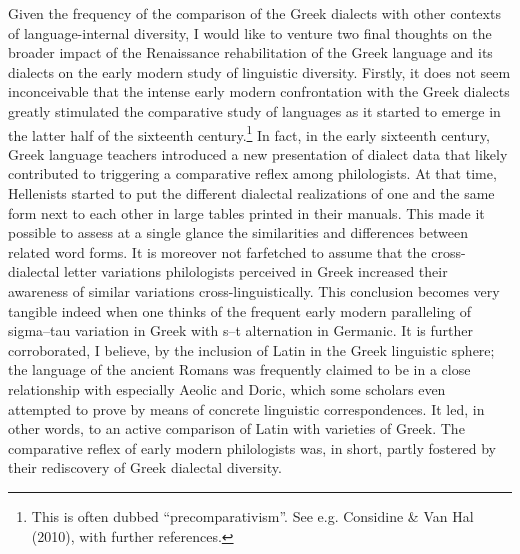 \begin{styleStandard}
Given the frequency of the comparison of the Greek dialects with other contexts of language-internal diversity, I would like to venture two final thoughts on the broader impact of the Renaissance rehabilitation of the Greek language and its dialects on the early modern study of linguistic diversity. Firstly, it does not seem inconceivable that the intense early modern confrontation with the Greek dialects greatly stimulated the comparative study of languages as it started to emerge in the latter half of the sixteenth century.\footnote{ This is often dubbed “precomparativism”. See e.g. Considine \& Van Hal (2010), with further references.} In fact, in the early sixteenth century, Greek language teachers introduced a new presentation of dialect data that likely contributed to triggering a comparative reflex among philologists. At that time, Hellenists started to put the different dialectal realizations of one and the same form next to each other in large tables printed in their manuals. This made it possible to assess at a single glance the similarities and differences between related word forms. It is moreover not farfetched to assume that the cross-dialectal letter variations philologists perceived in Greek increased their awareness of similar variations cross-linguistically. This conclusion becomes very tangible indeed when one thinks of the frequent early modern paralleling of sigma–tau variation in Greek with s–t alternation in Germanic. It is further corroborated, I believe, by the inclusion of Latin in the Greek linguistic sphere; the language of the ancient Romans was frequently claimed to be in a close relationship with especially Aeolic and Doric, which some scholars even attempted to prove by means of concrete linguistic correspondences. It led, in other words, to an active comparison of Latin with varieties of Greek. The comparative reflex of early modern philologists was, in short, partly fostered by their rediscovery of Greek dialectal diversity.
\end{styleStandard}

